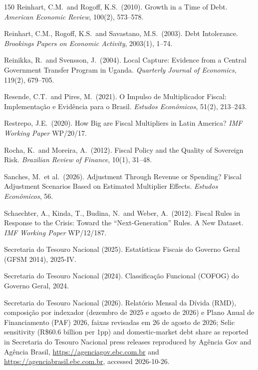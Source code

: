 \documentclass[11pt,a4paper]{article}
\begin{document}
\begin{thebibliography}{150}
 Reinhart, C.M.\ and Rogoff, K.S.\ (2010). Growth in a Time of Debt. \textit{American Economic Review}, 100(2), 573--578.

 Reinhart, C.M., Rogoff, K.S.\ and Savastano, M.S.\ (2003). Debt Intolerance. \textit{Brookings Papers on Economic Activity}, 2003(1), 1--74.

 Reinikka, R.\ and Svensson, J.\ (2004). Local Capture: Evidence from a Central Government Transfer Program in Uganda. \textit{Quarterly Journal of Economics}, 119(2), 679--705.

 Resende, C.T.\ and Pires, M.\ (2021). O Impulso de Multiplicador Fiscal: Implementa\c{c}\~ao e Evid\^encia para o Brasil. \textit{Estudos Econ\^omicos}, 51(2), 213--243.

 Restrepo, J.E.\ (2020). How Big are Fiscal Multipliers in Latin America? \textit{IMF Working Paper} WP/20/17.

 Rocha, K.\ and Moreira, A.\ (2012). Fiscal Policy and the Quality of Sovereign Risk. \textit{Brazilian Review of Finance}, 10(1), 31--48.

 Sanches, M.\ et al.\ (2026). Adjustment Through Revenue or Spending? Fiscal Adjustment Scenarios Based on Estimated Multiplier Effects. \textit{Estudos Econ\^omicos}, 56.

 Schaechter, A., Kinda, T., Budina, N.\ and Weber, A.\ (2012). Fiscal Rules in Response to the Crisis: Toward the ``Next-Generation'' Rules. A New Dataset. \textit{IMF Working Paper} WP/12/187.

 Secretaria do Tesouro Nacional (2025). Estat\'isticas Fiscais do Governo Geral (GFSM 2014), 2025-IV.

 Secretaria do Tesouro Nacional (2024). Classifica\c{c}\~ao Funcional (COFOG) do Governo Geral, 2024.

 Secretaria do Tesouro Nacional (2026). Relat\'orio Mensal da D\'ivida (RMD), composi\c{c}\~ao por indexador (dezembro de 2025 e agosto de 2026) e Plano Anual de Financiamento (PAF) 2026, faixas revisadas em 26 de agosto de 2026; Selic sensitivity (R\$60.6 billion per 1pp) and domestic-market debt share as reported in Secretaria do Tesouro Nacional press releases reproduced by Ag\^encia Gov and Ag\^encia Brasil, \url{https://agenciagov.ebc.com.br} and \url{https://agenciabrasil.ebc.com.br}, accessed 2026-10-26.


\end{thebibliography}
\end{document}
